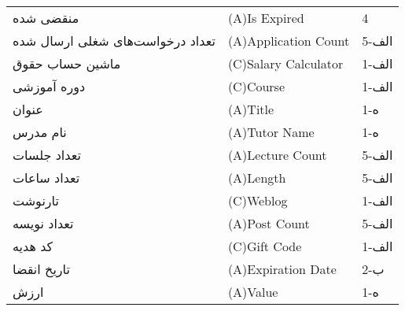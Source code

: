 \documentclass[12pt]{article}
\begin{document}
\begin{table}[]
\begin{tabular}{lll}
			منقضی شده                            & (A)Is Expired                                                                                                 & 4     \\
			تعداد درخواست‌های شغلی ارسال شده     & (A)Application Count                                                                                          & 5-الف \\
			ماشین حساب حقوق                      & (C)Salary Calculator                                                                                          & 1-الف \\
			دوره آموزشی                          & (C)Course                                                                                                     & 1-الف \\
			عنوان                                & (A)Title                                                                                                      & 1-ه   \\
			نام مدرس                             & (A)Tutor Name                                                                                                 & 1-ه   \\
			تعداد جلسات                          & (A)Lecture Count                                                                                              & 5-الف \\
			تعداد ساعات                          & (A)Length                                                                                                     & 5-الف \\
			تارنوشت                              & (C)Weblog                                                                                                     & 1-الف \\
			تعداد نویسه                          & (A)Post Count                                                                                                 & 5-الف \\
			کد هدیه                              & (C)Gift Code                                                                                                  & 1-الف \\
			تاریخ انقضا                          & (A)Expiration Date                                                                                            & 2-ب   \\
			ارزش                                 & (A)Value                                                                                                      & 1-ه   \\

\end{tabular}
\end{table}
\end{document}

